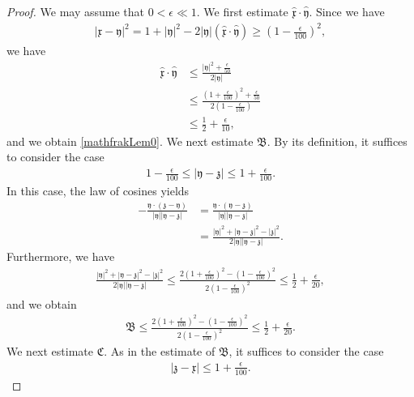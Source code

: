 \documentclass[reqno]{amsart}
\theoremstyle{plain}
\theoremstyle{definition}
\numberwithin{equation}{section}
\begin{document}
\begin{proof}
We may assume that $0<\epsilon\ll 1$. We first estimate
$\hat{\mathfrak{x}}\cdot\hat{\mathfrak{y}}$. Since we have
\begin{align*}
|\mathfrak{x}-\mathfrak{y}|^2
=1+|\mathfrak{y}|^2
-2|\mathfrak{y}|
\left(\hat{\mathfrak{x}}\cdot\hat{\mathfrak{y}}\right)
\geq
\left(1-\frac{\epsilon}{100}\right)^2,
\end{align*}
we have
\begin{align*}
\hat{\mathfrak{x}}\cdot\hat{\mathfrak{y}}
&\leq
\frac{|\mathfrak{y}|^2+\frac{\epsilon}{50}}
{2|\mathfrak{y}|}
\\
&\leq
\frac{\left(1+\frac{\epsilon}{100}\right)^2+\frac{\epsilon}{50}}
{2\left(1-\frac{\epsilon}{100}\right)}
\\
&\leq
\frac{1}{2}+\frac{\epsilon}{10},
\end{align*}
and we obtain \eqref{mathfrakLem0}. We next estimate $\mathfrak{B}$. By its definition, it suffices to consider the case
\begin{align*}
1-\frac{\epsilon}{100}\leq |\mathfrak{y}-\mathfrak{z}|\leq 1+\frac{\epsilon}{100}.
\end{align*}
In this case, the law of cosines yields
\begin{align*}
-\frac{\mathfrak{y}\cdot(\mathfrak{z}-\mathfrak{y})}
{|\mathfrak{y}||\mathfrak{y}-\mathfrak{z}|}
&=
\frac{\mathfrak{y}\cdot(\mathfrak{y}-\mathfrak{z})}
{|\mathfrak{y}||\mathfrak{y}-\mathfrak{z}|}
\\
&=
\frac{|\mathfrak{y}|^2+|\mathfrak{y}-\mathfrak{z}|^2
-|\mathfrak{z}|^2}
{2|\mathfrak{y}||\mathfrak{y}-\mathfrak{z}|}.
\end{align*}
Furthermore, we have
\begin{align*}
\frac{|\mathfrak{y}|^2+|\mathfrak{y}-\mathfrak{z}|^2
-|\mathfrak{z}|^2}
{2|\mathfrak{y}||\mathfrak{y}-\mathfrak{z}|}\leq \frac{2(1+\frac{\epsilon}{100})^2-(1-\frac{\epsilon}{100})^2}{2(1-\frac{\epsilon}{100})^2}\leq \frac{1}{2}+\frac{\epsilon}{20},
\end{align*}
and we obtain
\begin{align}\label{mathfrakBes}
\mathfrak{B}\leq \frac{2(1+\frac{\epsilon}{100})^2-(1-\frac{\epsilon}{100})^2}{2(1-\frac{\epsilon}{100})^2}\leq \frac{1}{2}+\frac{\epsilon}{20}.
\end{align}
We next estimate $\mathfrak{C}$. As in the estimate of $\mathfrak{B}$, it suffices to consider the case
\begin{align*}
|\mathfrak{z}-\mathfrak{x}|
\leq 1+\frac{\epsilon}{100}.

\end{align*}
\end{proof}
\end{document}
